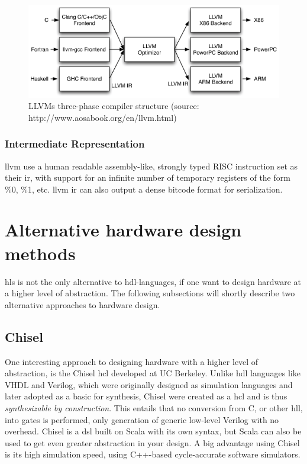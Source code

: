\begin{figure}[hbpt]
\centering
\includegraphics[width=\textwidth]{../figs/LLVMCompiler.png}
\caption{\label{fig:llvmcompiler}LLVMs three-phase compiler structure (source: http://www.aosabook.org/en/llvm.html)}
\end{figure}
\subsubsection{Intermediate Representation}

\gls{llvm} use a human readable assembly-like, strongly typed RISC instruction set as their \gls{ir}, with support for an infinite number of temporary registers of the form \%0, \%1, etc. \gls{llvm} \gls{ir} can also output a dense bitcode format for serialization.

\section{Alternative hardware design methods}
\gls{hls} is not the only alternative to \gls{hdl}-languages, if one want to design hardware at a higher level of abstraction. The following subsections will shortly describe two alternative approaches to hardware design. 
\subsection{Chisel}
One interesting approach to designing hardware with a higher level of abstraction, is the Chisel \gls{hcl} \cite{bachrach2012chisel} developed at UC Berkeley. Unlike \gls{hdl} languages like VHDL and Verilog, which were originally designed as simulation languages and later adopted as a basic for synthesis, Chisel were created as a \gls{hcl} and is thus \textit{synthesizable by construction}. This entails that no conversion from C, or other \gls{hll}, into gates is performed, only generation of generic low-level Verilog with no overhead. Chisel is a \gls{dsl} built on Scala \cite{odersky2004overview} with its own syntax, but Scala can also be used to get even greater abstraction in your design. A big advantage using Chisel is its high simulation speed, using C++-based cycle-accurate software simulators.
